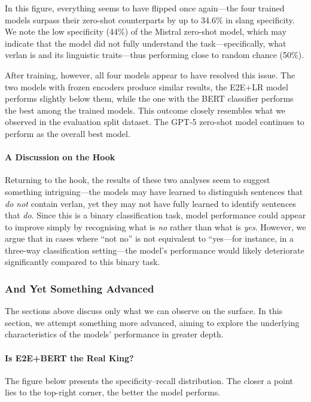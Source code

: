 \documentclass[12pt]{article}
\begin{document}
In this figure, everything seems to have flipped once again\;---\;the four trained models surpass their zero-shot counterparts by up to 34.6\% in slang specificity. 
We note the low specificity (44\%) of the Mistral zero-shot model, which may indicate that the model did not fully understand the task\;---\;specifically, what verlan is and its linguistic traits\;---\;thus performing close to random chance (50\%).

After training, however, all four models appear to have resolved this issue. 
The two models with frozen encoders produce similar results, the E2E+LR model performs slightly below them, while the one with the BERT classifier performs the best among the trained models. 
This outcome closely resembles what we observed in the evaluation split dataset. 
The GPT-5 zero-shot model continues to perform as the overall best model.

\paragraph{A Discussion on the Hook}
Returning to the hook, the results of these two analyses seem to suggest something intriguing\;---\;the models may have learned to distinguish sentences that \textit{do not} contain verlan, yet they may not have fully learned to identify sentences that \textit{do}. 
Since this is a binary classification task, model performance could appear to improve simply by recognising what is \textit{no} rather than what is \textit{yes}. 
However, we argue that in cases where “not no” is not equivalent to “yes\;---\;for instance, in a three-way classification setting\;---\;the model's performance would likely deteriorate significantly compared to this binary task.

\subsubsection{And Yet Something Advanced}

The sections above discuss only what we can observe on the surface. 
In this section, we attempt something more advanced, aiming to explore the underlying characteristics of the models' performance in greater depth.

\paragraph{Is E2E+BERT the Real King?}

The figure below presents the specificity--recall distribution. 
The closer a point lies to the top-right corner, the better the model performs.
\end{document}
